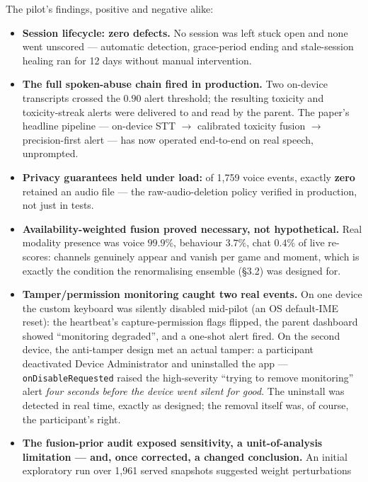 \documentclass[11pt,a4paper]{article}
\begin{document}
The pilot's findings, positive and negative alike:
\begin{itemize}[leftmargin=1.4em]
  \item \textbf{Session lifecycle: zero defects.} No session was left stuck open and
        none went unscored --- automatic detection, grace-period ending and
        stale-session healing ran for 12 days without manual intervention.
  \item \textbf{The full spoken-abuse chain fired in production.} Two on-device
        transcripts crossed the $0.90$ alert threshold; the resulting toxicity and
        toxicity-streak alerts were delivered to and read by the parent. The paper's
        headline pipeline --- on-device STT $\rightarrow$ calibrated toxicity fusion
        $\rightarrow$ precision-first alert --- has now operated end-to-end on real
        speech, unprompted.
  \item \textbf{Privacy guarantees held under load:} of 1{,}759 voice events, exactly
        \textbf{zero} retained an audio file --- the raw-audio-deletion policy verified
        in production, not just in tests.
  \item \textbf{Availability-weighted fusion proved necessary, not hypothetical.}
        Real modality presence was voice $99.9\%$, behaviour $3.7\%$, chat $0.4\%$ of
        live re-scores: channels genuinely appear and vanish per game and moment,
        which is exactly the condition the renormalising ensemble (\S3.2) was designed
        for.
  \item \textbf{Tamper/permission monitoring caught two real events.} On one device
        the custom keyboard was silently disabled mid-pilot (an OS default-IME reset):
        the heartbeat's capture-permission flags flipped, the parent dashboard showed
        ``monitoring degraded'', and a one-shot alert fired. On the second device, the
        anti-tamper design met an actual tamper: a participant deactivated Device
        Administrator and uninstalled the app --- \texttt{onDisableRequested} raised
        the high-severity ``trying to remove monitoring'' alert \emph{four seconds
        before the device went silent for good}. The uninstall was detected in real
        time, exactly as designed; the removal itself was, of course, the
        participant's right.
  \item \textbf{The fusion-prior audit exposed sensitivity, a unit-of-analysis
        limitation --- and, once corrected, a changed conclusion.} An initial
        exploratory run over 1{,}961 served snapshots suggested weight perturbations

\end{itemize}
\end{document}
